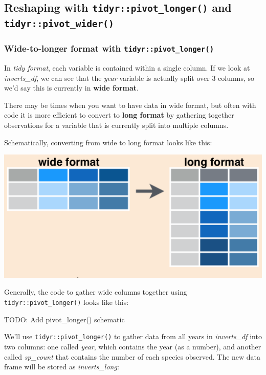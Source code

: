 \documentclass[]{book}
\begin{document}
\hypertarget{reshaping-with-tidyrpivot_longer-and-tidyrpivot_wider}{%
\subsection{\texorpdfstring{Reshaping with \texttt{tidyr::pivot\_longer()} and \texttt{tidyr::pivot\_wider()}}{Reshaping with tidyr::pivot\_longer() and tidyr::pivot\_wider()}}\label{reshaping-with-tidyrpivot_longer-and-tidyrpivot_wider}}

\hypertarget{wide-to-longer-format-with-tidyrpivot_longer}{%
\subsubsection{\texorpdfstring{Wide-to-longer format with \texttt{tidyr::pivot\_longer()}}{Wide-to-longer format with tidyr::pivot\_longer()}}\label{wide-to-longer-format-with-tidyrpivot_longer}}

In \emph{tidy format}, each variable is contained within a single column. If we look at \emph{inverts\_df}, we can see that the \emph{year} variable is actually split over 3 columns, so we'd say this is currently in \textbf{wide format}.

There may be times when you want to have data in wide format, but often with code it is more efficient to convert to \textbf{long format} by gathering together observations for a variable that is currently split into multiple columns.

Schematically, converting from wide to long format looks like this:

\includegraphics{img/tidyr_pivot_longer.png}

Generally, the code to gather wide columns together using \texttt{tidyr::pivot\_longer()} looks like this:

TODO: Add pivot\_longer() schematic

We'll use \texttt{tidyr::pivot\_longer()} to gather data from all years in \emph{inverts\_df} into two columns: one called \emph{year}, which contains the year (as a number), and another called \emph{sp\_count} that contains the number of each species observed. The new data frame will be stored as \emph{inverts\_long}:
\end{document}
